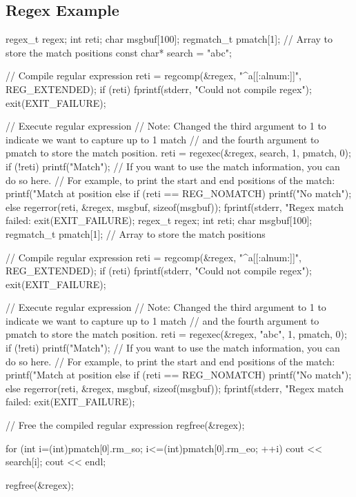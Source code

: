 \documentclass{report}
\begin{document}
    \subsection{Regex Example}
    \bigbreak \noindent 
    \begin{cppcode}
        regex_t regex;
        int reti;
        char msgbuf[100];
        regmatch_t pmatch[1]; // Array to store the match positions
        const char* search = "abc";

        // Compile regular expression
        reti = regcomp(&regex, "^a[[:alnum:]]", REG_EXTENDED);
        if (reti) {
            fprintf(stderr, "Could not compile regex\n");
            exit(EXIT_FAILURE);
        }

        // Execute regular expression
        // Note: Changed the third argument to 1 to indicate we want to capture up to 1 match
        // and the fourth argument to pmatch to store the match position.
        reti = regexec(&regex, search, 1, pmatch, 0);
        if (!reti) {
            printf("Match\n");
            // If you want to use the match information, you can do so here.
            // For example, to print the start and end positions of the match:
            printf("Match at position %
        }
        else if (reti == REG_NOMATCH) {
            printf("No match\n");
        }
        else {
            regerror(reti, &regex, msgbuf, sizeof(msgbuf));
            fprintf(stderr, "Regex match failed: %
            exit(EXIT_FAILURE);
        }regex_t regex;
    int reti;
    char msgbuf[100];
    regmatch_t pmatch[1]; // Array to store the match positions

    // Compile regular expression
    reti = regcomp(&regex, "^a[[:alnum:]]", REG_EXTENDED);
    if (reti) {
        fprintf(stderr, "Could not compile regex\n");
        exit(EXIT_FAILURE);
    }
    \end{cppcode}

    \pagebreak 
    \begin{cppcode}
    // Execute regular expression
    // Note: Changed the third argument to 1 to indicate we want to capture up to 1 match
    // and the fourth argument to pmatch to store the match position.
    reti = regexec(&regex, "abc", 1, pmatch, 0);
    if (!reti) {
        printf("Match\n");
        // If you want to use the match information, you can do so here.
        // For example, to print the start and end positions of the match:
        printf("Match at position %
    }
    else if (reti == REG_NOMATCH) {
        printf("No match\n");
    }
    else {
        regerror(reti, &regex, msgbuf, sizeof(msgbuf));
        fprintf(stderr, "Regex match failed: %
        exit(EXIT_FAILURE);
    }

    // Free the compiled regular expression
    regfree(&regex);

        for (int i=(int)pmatch[0].rm_so; i<=(int)pmatch[0].rm_eo; ++i) {
            cout << search[i];
        }
        cout << endl;

        regfree(&regex);
    \end{cppcode}
\end{document}
